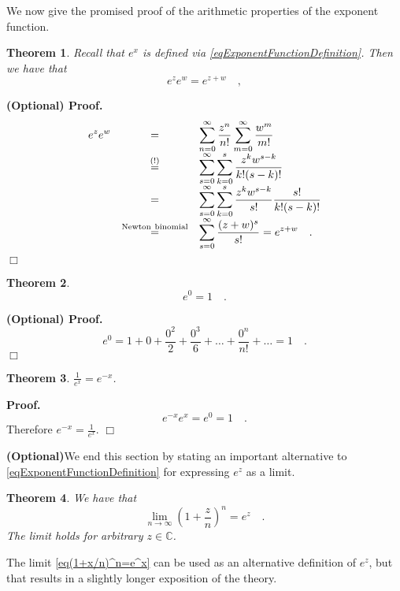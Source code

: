 \documentclass[12pt]{book}
\newcommand{\eqAttention}{\stackrel{(!)}{=}}
\newcommand{\importantFormula}[1]{\begin{equation} \boxed{#1} \end{equation}}
\newenvironment{proof}[1][]{ \textbf{Proof#1.} }{$\Box$\medskip}
\newenvironment{proofOptional}[1][]{ \noindent \textbf{(Optional) Proof#1.}}{$\Box$\medskip}
\newtheorem{theorem}{Theorem}[section]
\newcommand{\optionalMaterial}{\textbf{(Optional)}}
\begin{document}
We now give the promised proof of the arithmetic properties of the exponent function.
\begin{theorem}\label{thExponentArgumentsAddWhenMultiplying}
Recall that $e^x$ is defined via \eqref{eqExponentFunctionDefinition}. Then we have that \importantFormula{
e^{z} e^{w}=e^{z+w}\quad ,
}
\end{theorem}
\begin{proofOptional}
\begin{equation*}
\begin{array}{rcl}
\displaystyle
\displaystyle e^{z} e^w&=&\displaystyle  \sum_{n=0}^{\infty} \frac{z^n}{n!} \sum_{m=0}^{\infty} \frac{w^m}{m!} \\ &\eqAttention&  \displaystyle  \sum_{s=0}^{\infty}\sum_{k=0 }^s \frac{z^{k}w^{s-k}}{k! (s-k)!} \\ &=& \displaystyle  \sum_{s=0}^{\infty}\sum_{k=0 }^s   \frac{z^{k}w^{s-k}}{s!} \frac{s!}{k! (s-k)!}\\ &\stackrel{\mathrm{Newton~binomial}}{=}& \displaystyle  \sum_{s=0}^{\infty} \frac{(z+w)^s}{s!}=e^{z+w}\quad .
\end{array}
\end{equation*}
\end{proofOptional}
\begin{theorem}
\[
e^0=1\quad .
\]
\end{theorem}
\begin{proofOptional}
\[ e^0 = 1+ 0+ \frac{0^2}{2}+ \frac{0^3}{6}+\dots +\frac{0^n}{n!}+\dots = 1\quad .
\]
\end{proofOptional}

\begin{theorem}
$\frac{1}{e^{x}}= e^{-x}$\quad .
\end{theorem}
\begin{proof}
\[e^{-x}e^x=e^0 = 1\quad .
\]
Therefore $e^{-x}=\frac{1}{e^x}.$
\end{proof}

\optionalMaterial We end this section by stating an important alternative to \ref{eqExponentFunctionDefinition} for expressing $e^z$ as a limit.   
\begin{theorem}\label{th(1+x/n)^n=e^x}
We have that
\begin{equation}\label{eq(1+x/n)^n=e^x}
\lim_{n\to \infty} \left(1+\frac{z}n\right)^n= e^z\quad .
\end{equation}
The limit holds for arbitrary $z\in \mathbb C$.
\end{theorem}
The limit \eqref{eq(1+x/n)^n=e^x} can be used as an alternative definition of $e^{z}$, but that results in a slightly longer exposition of the theory.  
\end{document}

